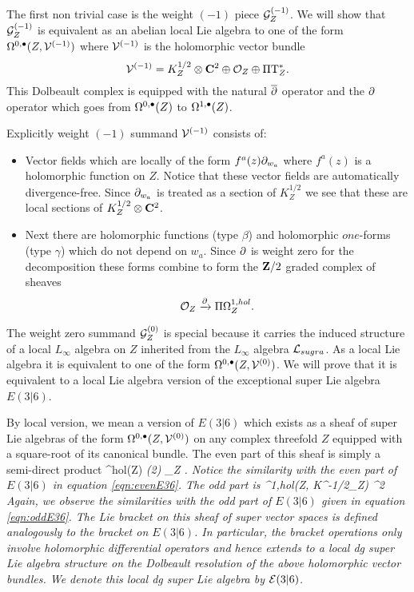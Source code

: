 \parsec[s:weight-1]

The first non trivial case is the weight $(-1)$ piece $\mathcal G_Z^{(-1)}$.
We will show that
$\mathcal G_Z^{(-1)}$ is equivalent as an abelian local Lie algebra to one of the form $\Omega^{0,\bullet}(Z, \mathcal V^{(-1)})$ where $\mathcal V^{(-1)}$ is the holomorphic vector bundle
\[
\mathcal V^{(-1)} = K^{1/2}_Z \otimes \mathbf{C}^2 \oplus \mathcal O_Z \oplus \Pi {\rm T}^*_Z .
\]
This Dolbeault complex is equipped with the natural $\overline{\partial}$ operator and the $\partial$ operator which goes from $\Omega^{0,\bullet}(Z)$ to $\Omega^{1,\bullet}(Z)$. 

Explicitly weight $(-1)$ summand $\mathcal V^{(-1)}$ consists of:
\begin{itemize}
\item 
Vector fields which are locally of the form $f^a(z) \partial_{w_a}$ where $f^{a}(z)$ is a holomorphic function on $Z$.
Notice that these vector fields are automatically divergence-free.
Since $\partial_{w_a}$ is treated as a section of $K^{1/2}_Z$ we see that these are local sections of $K^{1/2}_Z \otimes \mathbf{C}^2$. 
\item 
Next there are holomorphic functions (type $\beta$) and holomorphic $one$-forms (type $\gamma$) which do not depend on $w_a$. 
Since $\partial$ is weight zero for the decomposition these forms combine to form the $\mathbf{Z}/2$ graded complex of sheaves
\[
\mathcal O_Z \xrightarrow{\partial} \Pi \Omega^{1,hol}_Z .
\]
\end{itemize}

\parsec[s:weight0]

The weight zero summand $\mathcal G_Z^{(0)}$ is special because it carries the induced structure of a local $L_\infty$ algebra on $Z$ inherited from the $L_\infty$ algebra $\mathcal L_{sugra}$.
As a local Lie algebra it is equivalent to one of the form $\Omega^{0,\bullet}(Z, \mathcal V^{(0)})$.
We will prove that it is equivalent to a local Lie algebra version of the exceptional super Lie algebra $E(3|6)$. 

By local version, we mean a version of $E(3|6)$ which exists as a sheaf of super Lie algebras of the form $\Omega^{0,\bullet}(Z, \mathcal V^{(0)})$ on any complex threefold $Z$ equipped with a square-root of its canonical bundle.
The even part of this sheaf is simply a semi-direct product 
\beqn
\Vect^{hol}(Z) \oplus \sl(2) \otimes \cO_Z .
\eeqn
Notice the similarity with the even part of $E(3|6)$ in equation \eqref{eqn:evenE36}. 
The odd part is 
\beqn
\Omega^{1,hol}(Z, K^{-1/2}_Z) \otimes \C^2 
\eeqn
Again, we observe the similarities with the odd part of $E(3|6)$ given in equation \eqref{eqn:oddE36}. 
The Lie bracket on this sheaf of super vector spaces is defined analogously to the bracket on $E(3|6)$. 
In particular, the bracket operations only involve holomorphic differential operators and hence extends to a local dg super Lie algebra structure on the Dolbeault resolution of the above holomorphic vector bundles. 
We denote this local dg super Lie algebra by $\mathcal E(3|6)$.

